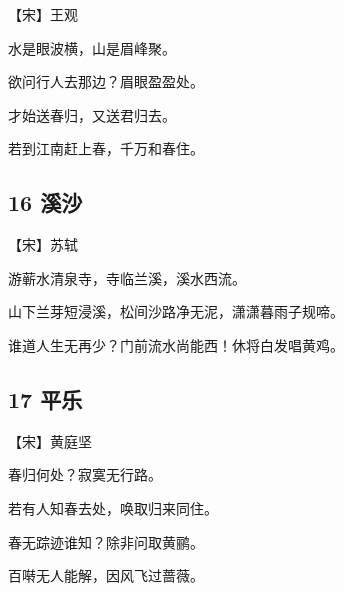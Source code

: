 \documentclass[a6paper, 12pt]{article}
\begin{document}
【宋】王观

水是眼波横，山是眉峰聚。

欲问行人去那边？眉眼盈盈处。

才始送春归，又送君归去。

若到江南赶上春，千万和春住。

\subsection*{16 溪沙}

【宋】苏轼

游蕲水清泉寺，寺临兰溪，溪水西流。

山下兰芽短浸溪，松间沙路净无泥，潇潇暮雨子规啼。

谁道人生无再少？门前流水尚能西！休将白发唱黄鸡。

\subsection*{17 平乐}

【宋】黄庭坚

春归何处？寂寞无行路。

若有人知春去处，唤取归来同住。

春无踪迹谁知？除非问取黄鹂。

百啭无人能解，因风飞过蔷薇。
\end{document}
